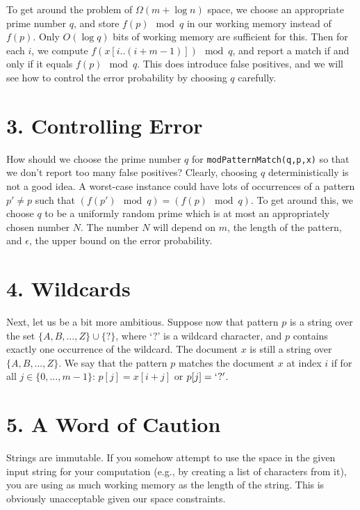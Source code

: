 \documentclass{article}
\begin{document}
To get around the problem of $\Omega(m + \log n)$ space, we choose an appropriate prime number $q$, and store $f(p) \mod q$ in our working memory instead of $f(p)$. Only $O(\log q)$ bits of working memory are sufficient for this. Then for each $i$, we compute $f(x[i..(i+m-1)]) \mod q$, and report a match if and only if it equals $f(p) \mod q$. This does introduce false positives, and we will see how to control the error probability by choosing $q$ carefully.

\section*{3. Controlling Error}
How should we choose the prime number $q$ for \texttt{modPatternMatch(q,p,x)} so that we don’t report too many false positives? Clearly, choosing $q$ deterministically is not a good idea. A worst-case instance could have lots of occurrences of a pattern $p' \neq p$ such that $(f(p') \mod q) = (f(p) \mod q)$. To get around this, we choose $q$ to be a uniformly random prime which is at most an appropriately chosen number $N$. The number $N$ will depend on $m$, the length of the pattern, and $\epsilon$, the upper bound on the error probability.

\section*{4. Wildcards}
Next, let us be a bit more ambitious. Suppose now that pattern $p$ is a string over the set $\{A,B, \dots,Z\} \cup \{?\}$, where ‘?’ is a wildcard character, and $p$ contains exactly one occurrence of the wildcard. The document $x$ is still a string over $\{A,B, \dots,Z\}$. We say that the pattern $p$ matches the document $x$ at index $i$ if for all $j \in \{0, \dots, m-1\}$: $p[j] = x[i+j]$ or $p[j] = `?'$.

\section*{5. A Word of Caution}
Strings are immutable. If you somehow attempt to use the space in the given input string for your computation (e.g., by creating a list of characters from it), you are using as much working memory as the length of the string. This is obviously unacceptable given our space constraints.
\end{document}
